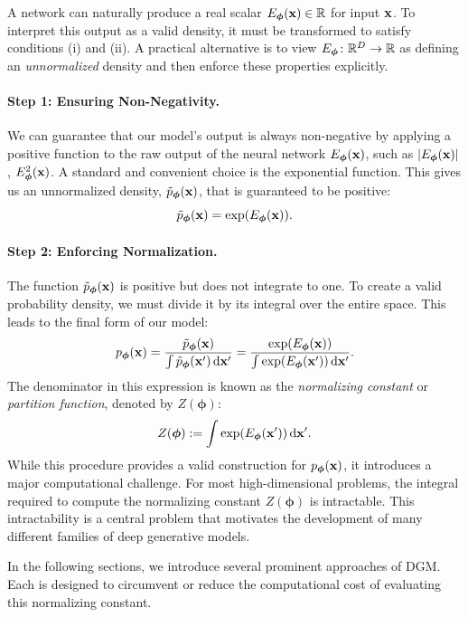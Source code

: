 A network can naturally produce a real scalar $E_{{\bm{\phi}}}({\mathbf{x}}) \in \mathbb{R}$ for input ${\mathbf{x}}$. To interpret this output as a valid density, it must be transformed to satisfy conditions (i) and (ii).  
A practical alternative is to view $E_{{\bm{\phi}}}\colon\mathbb{R}^D\to\mathbb{R}$ as defining an \emph{unnormalized} density and then enforce these properties explicitly.


\paragraph{Step 1: Ensuring Non-Negativity.}
We can guarantee that our model's output is always non-negative by applying a positive function to the raw output of the neural network $E_{\bm{\phi}}({\mathbf{x}})$, such as $\left|E_{\bm{\phi}}({\mathbf{x}})\right|$, $E^2_{\bm{\phi}}({\mathbf{x}})$. A standard and convenient choice is the exponential function. This gives us an unnormalized density, $\tilde{p}_{\bm{\phi}}({\mathbf{x}})$, that is guaranteed to be positive:
\[
\tilde{p}_{\bm{\phi}}({\mathbf{x}}) = \exp(E_{\bm{\phi}}({\mathbf{x}})).
\]

\paragraph{Step 2: Enforcing Normalization.}
The function $\tilde{p}_{\bm{\phi}}({\mathbf{x}})$ is positive but does not integrate to one. To create a valid probability density, we must divide it by its integral over the entire space. This leads to the final form of our model:
\[
p_{\bm{\phi}}({\mathbf{x}}) = \frac{\tilde{p}_{\bm{\phi}}({\mathbf{x}})}{\int \tilde{p}_{\bm{\phi}}({\mathbf{x}}') \mathop{}\!\mathrm{d} {\mathbf{x}}'} = \frac{\exp(E_{\bm{\phi}}({\mathbf{x}}))}{\int \exp(E_{\bm{\phi}}({\mathbf{x}}')) \mathop{}\!\mathrm{d} {\mathbf{x}}'}.
\]
The denominator in this expression is known as the \emph{normalizing constant} or \emph{partition function}, denoted by $Z(\bm{\phi})$:
\[
Z(\bm{\phi}) := \int \exp(E_{\bm{\phi}}({\mathbf{x}}')) \mathop{}\!\mathrm{d} {\mathbf{x}}'.
\]
While this procedure provides a valid construction for $p_{\bm{\phi}}({\mathbf{x}})$, it introduces a major computational challenge. For most high-dimensional problems, the integral required to compute the normalizing constant $Z(\bm{\phi})$ is intractable. This intractability is a central problem that motivates the development of many different families of deep generative models.


In the following sections, we introduce several prominent approaches of DGM. Each is designed to circumvent or reduce the computational cost of evaluating this normalizing constant.
\newpage



